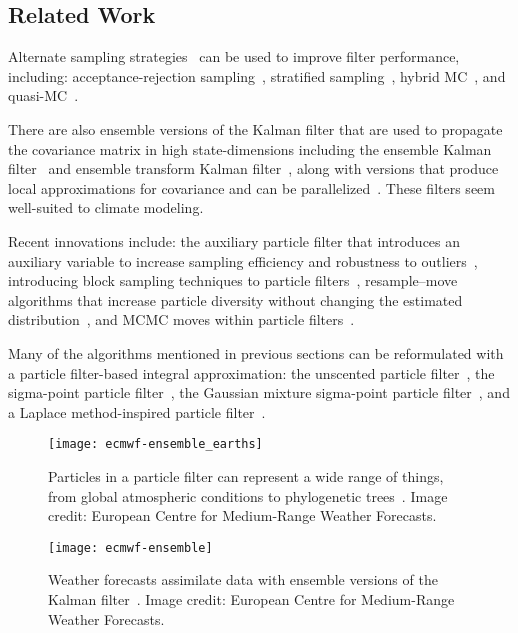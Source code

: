\subsection{Related Work}
Alternate sampling strategies~\cite[see, e.g.,][]{Che03,Liu08} can be used to improve filter performance, including: acceptance-rejection sampling~\cite{Han69}, stratified sampling~\cite{Dou05}, hybrid MC~\cite{Cho01}, and quasi-MC~\cite{Ger15}.

There are also ensemble versions of the Kalman filter that are used to propagate the covariance matrix in high state-dimensions including the ensemble Kalman filter~\cite[enKF:][]{Gei94} and ensemble transform Kalman filter~\cite[ETKF:][]{Bis01,Maj02}, along with versions that produce local approximations for covariance and can be parallelized~\cite{Ott02,Ott04,Hun07}.  These filters seem well-suited to climate modeling. 

Recent innovations include: the auxiliary particle filter that introduces an auxiliary variable to increase sampling efficiency and robustness to outliers~\cite{Pit99}, introducing block sampling techniques to particle filters~\cite{Dou06}, resample--move algorithms that increase particle diversity without changing the estimated distribution~\cite{Gil01}, and MCMC moves within particle filters~\cite{And10}.

Many of the algorithms mentioned in previous sections can be reformulated with a particle filter-based integral approximation: the unscented particle filter~\cite{van01b},
the sigma-point particle filter~\cite{van04}, the Gaussian mixture sigma-point particle filter~\cite{van03}, and a Laplace method-inspired particle filter~\cite{Qua16}.

\begin{figure}[h]
\begin{minipage}[t]{.45\textwidth}
\texttt{[image: ecmwf-ensemble\_earths]}
\caption[An Ensemble of Earths]{Particles in a particle filter can represent a wide range of things, from global atmospheric conditions to phylogenetic trees~\cite{Bou12,Wan15,Din18}. Image credit: European Centre for Medium-Range Weather Forecasts.}
\end{minipage}%
\hfill
\begin{minipage}[t]{.45\textwidth}
\texttt{[image: ecmwf-ensemble]}
\caption[An Ensemble Weather Forecast, Illustrated]{Weather forecasts assimilate data with ensemble versions of the Kalman filter~\cite{Gei94,Bis01,Ott04,Hun07,Bue17}.  Image credit: European Centre for Medium-Range Weather Forecasts.}
\end{minipage}
\end{figure}

